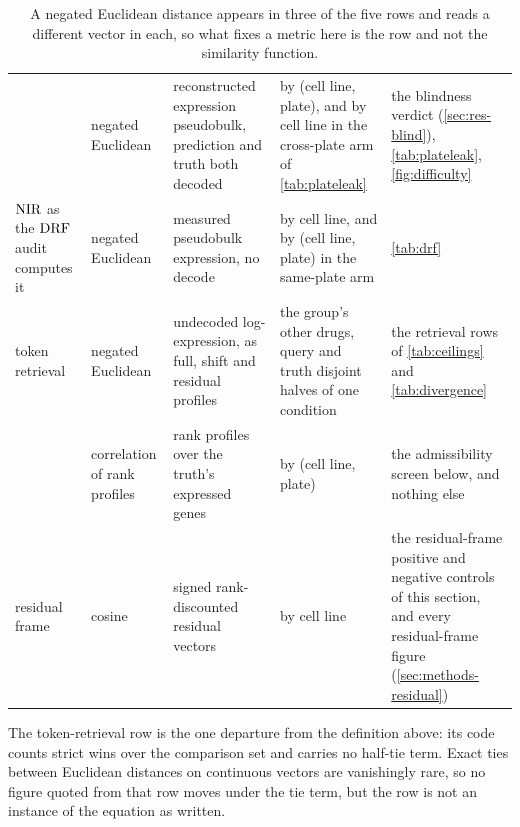 \begin{table}[htbp]
\caption{ A negated Euclidean distance appears in three of the five rows
and reads a different vector in each, so what fixes a metric here is the row and
not the similarity function.}
\label{tab:sigma}
\begin{fullwidth}
\begin{threeparttable}
\begin{tabularx}{\linewidth}{@{}L{26.5mm} L{28mm} Z{1.05} Z{0.98} >{}Z{0.97}@{}}
 & \thead{$\sigma$} & 
  &  &  \\
\midrule
{} & negated Euclidean & reconstructed expression pseudobulk,
  prediction and truth both decoded & by (cell line, plate), and by cell line in
  the cross-plate arm of \cref{tab:plateleak}
  & the blindness verdict (\cref{sec:res-blind}), \cref{tab:plateleak},
  \cref{fig:difficulty} \\
\addlinespace[10pt]
$\textrm{NIR}$ as the $\textrm{DRF}$ audit computes it & negated Euclidean & measured pseudobulk
  expression, no decode & by cell line, and by (cell line, plate) in the
  same-plate arm & \cref{tab:drf} \\
\addlinespace[10pt]
token retrieval & negated Euclidean & undecoded log-expression, as full, shift
  and residual profiles & the group's other drugs, query and truth disjoint
  halves of one condition & the retrieval rows of \cref{tab:ceilings} and
  \cref{tab:divergence} \\
\addlinespace[10pt]
 & correlation of rank profiles & rank profiles over the
  truth's expressed genes & by (cell line, plate) & the admissibility screen
  below, and nothing else \\
\addlinespace[10pt]
residual frame & cosine & signed rank-discounted residual vectors & by cell line
  & the residual-frame positive and negative controls of this section, and every residual-frame figure (\cref{sec:methods-residual}) \\
\end{tabularx}
\begin{tablenotes}[flushleft]
\item The token-retrieval row is the one departure from the definition above:
its code counts strict wins over the comparison set and carries no half-tie
term. Exact ties between Euclidean distances on continuous vectors are
vanishingly rare, so no figure quoted from that row moves under the tie term,
but the row is not an instance of the equation as written.
\end{tablenotes}
\end{threeparttable}
\end{fullwidth}
\end{table}


